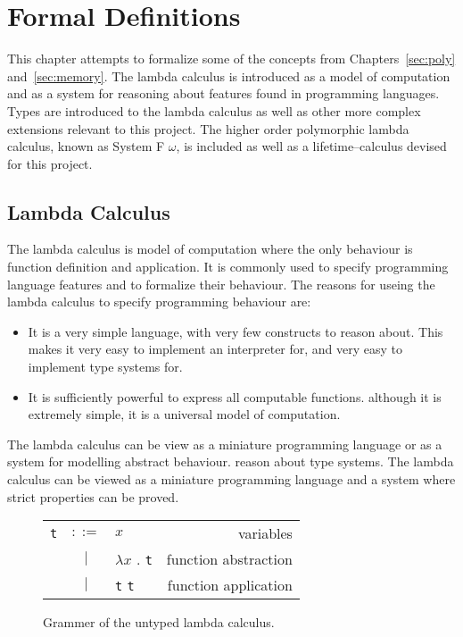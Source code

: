 \chapter{Formal Definitions}\label{sec:formal}
This chapter attempts to formalize some of the concepts from
Chapters~\ref{sec:poly} and~\ref{sec:memory}. The lambda calculus is introduced
as a model of computation and as a system for reasoning about features found in
programming languages. Types are introduced to the lambda calculus as well as
other more complex extensions relevant to this project. The higher order
polymorphic lambda calculus, known as System F $\omega$, is included as well as
a lifetime--calculus devised for this project.

\section{Lambda Calculus}\label{sec:lambdacalc}
The lambda calculus is model of computation where the only behaviour is
function definition and application. It is commonly used to specify programming
language features and to formalize their behaviour.
The reasons for useing the lambda calculus to specify programming behaviour are:
\begin{itemize}
    \item It is a very simple language, with very few constructs to reason about.
        This makes it very easy to implement an interpreter for, and very easy
        to implement type systems for.
    \item It is sufficiently powerful to express all computable functions.
        although it is extremely simple, it is a universal model of computation.
\end{itemize}
The lambda calculus can be view as a  miniature programming language or as a
system for modelling abstract behaviour. 
reason about type systems. The lambda calculus can be viewed as a miniature
programming language and a system where strict properties can be proved.

\begin{figure}[H]\label{fig:lambdaCalc}
    \begin{tabular}{l c p{3cm} r}
        \texttt{t} & $ ::= $ & $ x $ &                   variables \\
      & $ | $ & $ \lambda x $ . \texttt{t} &          function abstraction \\
      & $ | $ & \texttt{t} \texttt{t} &          function application \\
    \end{tabular}
    \caption{Grammer of the untyped lambda calculus.}
\end{figure}

